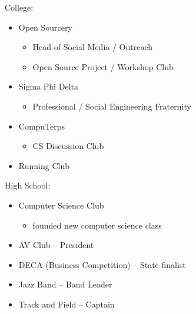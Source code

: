 \documentclass[11pt]{article}
\begin{document}
{\fontsize{10}{12}\robotocondlight
\begin{multicols}{2}
    College: 
    \begin{itemize}[noitemsep,nolistsep]
        \item Open Sourcery
        \begin{itemize}[noitemsep,nolistsep]
            \item Head of Social Media / Outreach
            \item Open Source Project / Workshop Club
        \end{itemize}
        \item Sigma Phi Delta
        \begin{itemize}[noitemsep,nolistsep]
            \item Professional / Social Engineering Fraternity
        \end{itemize}
        \item CompuTerps
        \begin{itemize}[noitemsep,nolistsep]
            \item CS Discussion Club
        \end{itemize}
        \item Running Club
    \end{itemize}
    \columnbreak
    High School:
    \begin{itemize}[noitemsep,nolistsep]
        \item Computer Science Club
        \begin{itemize}[noitemsep,nolistsep]
            \item founded new computer science class
        \end{itemize}
        \item AV Club – President
        \item DECA (Business Competition) – State finalist
        \item Jazz Band – Band Leader
        \item Track and Field – Captain
    \end{itemize}
\end{multicols}
}
\end{document}
